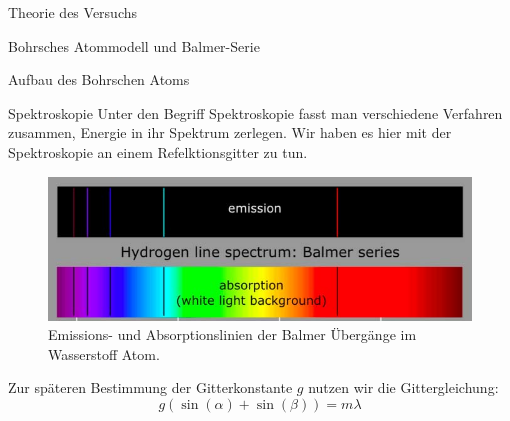 \documentclass[pdftex, a4paper,11pt, twoside, ngerman]{report}
\begin{document}
\begin{chapter}{Theorie des Versuchs}
\begin{section}{Bohrsches Atommodell und Balmer-Serie}
\begin{subsection}{Aufbau des Bohrschen Atoms}
       
      \end{subsection}
     
     
     
      \begin{subsection}{Spektroskopie}
        \label{chp:TheorieBohrBalmerSerieSpektroskopie}
        Unter den Begriff Spektroskopie fasst man verschiedene Verfahren
        zusammen, Energie in ihr Spektrum zerlegen.
        Wir haben es hier mit der Spektroskopie an einem Refelktionsgitter zu
        tun.
        \begin{figure}[b]
          \begin{center}
            \includegraphics[width=.95\textwidth]
                {Figures/BalmerserieEmissionAbsorption.png}
            \caption{Emissions- und Absorptionslinien der Balmer Übergänge im
                Wasserstoff Atom.
                \cite{bib:BalmerserieEmissionAbsorption}}
            \label{fig:BalmerserieEmissionAbsorption}
          \end{center}
        \end{figure}
        Zur späteren Bestimmung der Gitterkonstante $g$ nutzen wir die
        Gittergleichung:
        \begin{equation}
          \label{eq:Gittergleichung}
          g(\sin(\alpha)+\sin(\beta))=m\lambda
        \end{equation}
       

\end{subsection}
\end{section}
\end{chapter}
\end{document}
